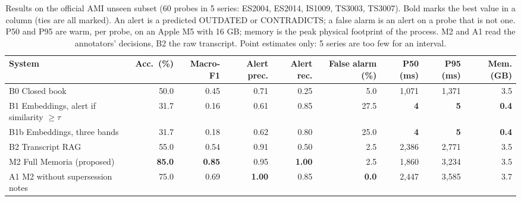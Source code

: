 \begin{table}[tbp]
\centering
\small
\caption{Results on the official AMI unseen subset (60 probes in 5 series: ES2004, ES2014, IS1009, TS3003, TS3007). Bold marks the best value in a column (ties are all marked). An alert is a predicted OUTDATED or CONTRADICTS; a false alarm is an alert on a probe that is not one. P50 and P95 are warm, per probe, on an Apple M5 with 16 GB; memory is the peak physical footprint of the process. M2 and A1 read the annotators' decisions, B2 the raw transcript. Point estimates only: 5 series are too few for an interval.}
\label{tab:memoriabench-unseen}
\begin{tabular}{@{}lrrrrrrrr@{}}
\toprule
System & Acc.\ (\%) & Macro-F1 & Alert prec. & Alert rec. & False alarm (\%) & P50 (ms) & P95 (ms) & Mem. (GB) \\
\midrule
B0 Closed book & 50.0 & 0.45 & 0.71 & 0.25 & 5.0 & 1{,}071 & 1{,}371 & 3.5 \\
B1 Embeddings, alert if similarity $\ge \tau$ & 31.7 & 0.16 & 0.61 & 0.85 & 27.5 & \textbf{4} & \textbf{5} & \textbf{0.4} \\
B1b Embeddings, three bands & 31.7 & 0.18 & 0.62 & 0.80 & 25.0 & \textbf{4} & \textbf{5} & \textbf{0.4} \\
B2 Transcript RAG & 55.0 & 0.54 & 0.91 & 0.50 & 2.5 & 2{,}386 & 2{,}771 & 3.5 \\
\midrule
M2 Full Memoria (proposed) & \textbf{85.0} & \textbf{0.85} & 0.95 & \textbf{1.00} & 2.5 & 1{,}860 & 3{,}234 & 3.5 \\
A1 M2 without supersession notes & 75.0 & 0.69 & \textbf{1.00} & 0.85 & \textbf{0.0} & 2{,}447 & 3{,}585 & 3.7 \\
\bottomrule
\end{tabular}
\end{table}
